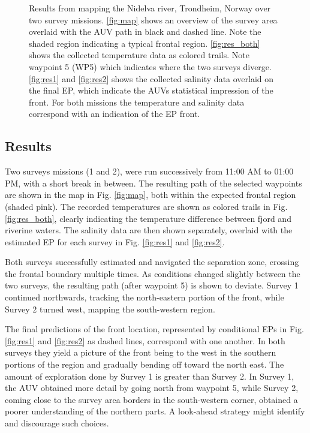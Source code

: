 \documentclass[aoas]{imsart}
\begin{document}
\begin{figure}[!h]
\caption{Results from mapping the Nidelva river, Trondheim, Norway
  over two survey missions. \ref{fig:map} shows an overview of the
  survey area overlaid with the AUV path in black and dashed
  line. Note the shaded region indicating a typical frontal
  region. \ref{fig:res_both} shows the collected temperature data as
  colored trails. Note waypoint 5 (WP5) which indicates where the two
  surveys diverge. \ref{fig:res1} and \ref{fig:res2} shows the
  collected salinity data overlaid on the final EP, which indicate the
  AUVs statistical impression of the front. For both missions the
  temperature and salinity data correspond with an indication of the
  EP front. }
\label{fig:results}
\end{figure}

\subsection{Results}

Two surveys missions (1 and 2), were run successively from 11:00 AM to
01:00 PM, with a short break in between. The resulting path of the
selected waypoints are shown in the map in Fig. \ref{fig:map}, both
within the expected frontal region (shaded pink). The recorded
temperatures are shown as colored trails in Fig. \ref{fig:res_both},
clearly indicating the temperature difference between fjord and
riverine waters. The salinity data are then shown separately, overlaid
with the estimated EP for each survey in Fig. \ref{fig:res1} and
\ref{fig:res2}.

Both surveys successfully estimated and navigated the separation zone,
crossing the frontal boundary multiple times. As conditions changed
slightly between the two surveys, the resulting path (after waypoint
5) is shown to deviate. Survey 1 continued northwards, tracking the
north-eastern portion of the front, while Survey 2 turned west,
mapping the south-western region.

The final predictions of the front location, represented by
conditional EPs in Fig. \ref{fig:res1} and \ref{fig:res2} as dashed
lines, correspond with one another. In both surveys they yield a
picture of the front being to the west in the southern portions of the
region and gradually bending off toward the north east. The amount of
exploration done by Survey 1 is greater than Survey 2. In Survey 1,
the AUV obtained more detail by going north from waypoint 5, while
Survey 2, coming close to the survey area borders in the south-western
corner, obtained a poorer understanding of the northern parts. A
look-ahead strategy might identify and discourage such choices.
\end{document}
